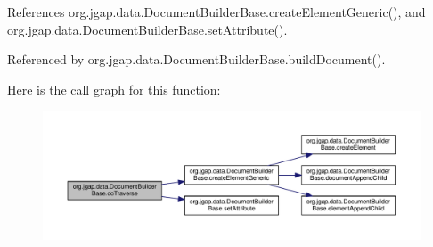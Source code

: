 References org.\-jgap.\-data.\-Document\-Builder\-Base.\-create\-Element\-Generic(), and org.\-jgap.\-data.\-Document\-Builder\-Base.\-set\-Attribute().



Referenced by org.\-jgap.\-data.\-Document\-Builder\-Base.\-build\-Document().



Here is the call graph for this function\-:
\nopagebreak
\begin{figure}[H]
\begin{center}
\leavevmode
\includegraphics[width=350pt]{classorg_1_1jgap_1_1data_1_1_document_builder_base_af8fa5961d7a5d6531c085ffd4f9eb2bb_cgraph}
\end{center}
\end{figure}


